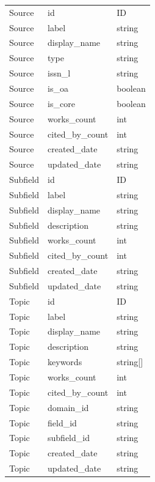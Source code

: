 \documentclass{llmxive}
\begin{document}
\begin{longtable}{p{2.8cm}p{5.5cm}p{3cm}}
Source & id & ID \\
Source & label & string \\
Source & display\_name & string \\
Source & type & string \\
Source & issn\_l & string \\
Source & is\_oa & boolean \\
Source & is\_core & boolean \\
Source & works\_count & int \\
Source & cited\_by\_count & int \\
Source & created\_date & string \\
Source & updated\_date & string \\

Subfield & id & ID \\
Subfield & label & string \\
Subfield & display\_name & string \\
Subfield & description & string \\
Subfield & works\_count & int \\
Subfield & cited\_by\_count & int \\
Subfield & created\_date & string \\
Subfield & updated\_date & string \\

Topic & id & ID \\
Topic & label & string \\
Topic & display\_name & string \\
Topic & description & string \\
Topic & keywords & string[] \\
Topic & works\_count & int \\
Topic & cited\_by\_count & int \\
Topic & domain\_id & string \\
Topic & field\_id & string \\
Topic & subfield\_id & string \\
Topic & created\_date & string \\
Topic & updated\_date & string \\

\end{longtable}
\end{document}
